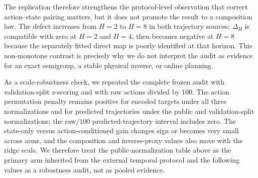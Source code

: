 \documentclass{article}
\begin{document}
The replication therefore strengthens the protocol-level observation that
correct action--state pairing matters, but it does not promote the result to a
composition law. The defect increases from $H=2$ to $H=8$ in both trajectory
sources; $\Delta_H$ is compatible with zero at $H=2$ and $H=4$, then becomes
negative at $H=8$ because the separately fitted direct map is poorly
identified at that horizon. This non-monotone contrast is precisely why we do
not interpret the audit as evidence for an exact semigroup, a stable physical
inverse, or online planning.

As a scale-robustness check, we repeated the complete frozen audit with
validation-split z-scoring and with raw actions divided by $100$. The action
permutation penalty remains positive for encoded targets under all three
normalizations and for predicted trajectories under the public and
validation-split normalizations; the raw$/100$ predicted-trajectory interval
includes zero. The state-only versus action-conditioned gain changes sign or
becomes very small across arms, and the composition and inverse-proxy values
also move with the ridge scale. We therefore treat the public-normalization
table above as the primary arm inherited from the external temporal protocol
and the following values as a robustness audit, not as pooled evidence.

\begin{table}[H]
\centering
\scriptsize
\setlength{\tabcolsep}{3pt}
\caption{Normalization robustness for the external action-algebra audit. Entries
are means; the primary public-normalization arm reports bootstrap intervals in
Tables~\ref{tab:supp-action-algebra-alignment} and
\ref{tab:supp-action-algebra-composition}.}
\label{tab:supp-action-algebra-normalization}
\end{table}
\end{document}
